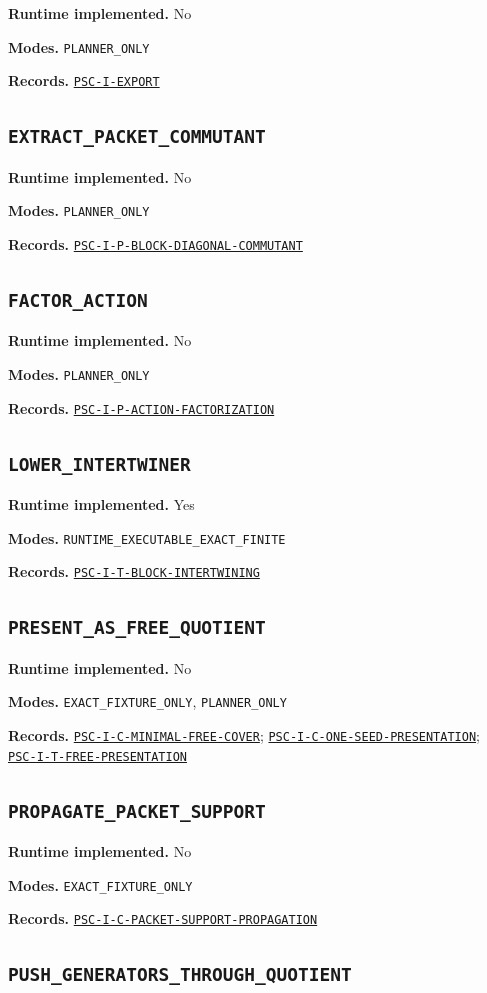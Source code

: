\documentclass[a4paper,11pt]{article}
\newcommand{\field}[2]{\par\smallskip\noindent\textbf{#1.} #2\par}
\begin{document}
\field{Runtime implemented}{No}
\field{Modes}{\nolinkurl{PLANNER_ONLY}}
\field{Records}{\hyperref[rec:PSC-I-EXPORT]{\nolinkurl{PSC-I-EXPORT}}}
\subsection*{\nolinkurl{EXTRACT_PACKET_COMMUTANT}}
\field{Runtime implemented}{No}
\field{Modes}{\nolinkurl{PLANNER_ONLY}}
\field{Records}{\hyperref[rec:PSC-I-P-BLOCK-DIAGONAL-COMMUTANT]{\nolinkurl{PSC-I-P-BLOCK-DIAGONAL-COMMUTANT}}}
\subsection*{\nolinkurl{FACTOR_ACTION}}
\field{Runtime implemented}{No}
\field{Modes}{\nolinkurl{PLANNER_ONLY}}
\field{Records}{\hyperref[rec:PSC-I-P-ACTION-FACTORIZATION]{\nolinkurl{PSC-I-P-ACTION-FACTORIZATION}}}
\subsection*{\nolinkurl{LOWER_INTERTWINER}}
\field{Runtime implemented}{Yes}
\field{Modes}{\nolinkurl{RUNTIME_EXECUTABLE_EXACT_FINITE}}
\field{Records}{\hyperref[rec:PSC-I-T-BLOCK-INTERTWINING]{\nolinkurl{PSC-I-T-BLOCK-INTERTWINING}}}
\subsection*{\nolinkurl{PRESENT_AS_FREE_QUOTIENT}}
\field{Runtime implemented}{No}
\field{Modes}{\nolinkurl{EXACT_FIXTURE_ONLY}, \nolinkurl{PLANNER_ONLY}}
\field{Records}{\hyperref[rec:PSC-I-C-MINIMAL-FREE-COVER]{\nolinkurl{PSC-I-C-MINIMAL-FREE-COVER}}; \hyperref[rec:PSC-I-C-ONE-SEED-PRESENTATION]{\nolinkurl{PSC-I-C-ONE-SEED-PRESENTATION}}; \hyperref[rec:PSC-I-T-FREE-PRESENTATION]{\nolinkurl{PSC-I-T-FREE-PRESENTATION}}}
\subsection*{\nolinkurl{PROPAGATE_PACKET_SUPPORT}}
\field{Runtime implemented}{No}
\field{Modes}{\nolinkurl{EXACT_FIXTURE_ONLY}}
\field{Records}{\hyperref[rec:PSC-I-C-PACKET-SUPPORT-PROPAGATION]{\nolinkurl{PSC-I-C-PACKET-SUPPORT-PROPAGATION}}}
\subsection*{\nolinkurl{PUSH_GENERATORS_THROUGH_QUOTIENT}}
\end{document}
